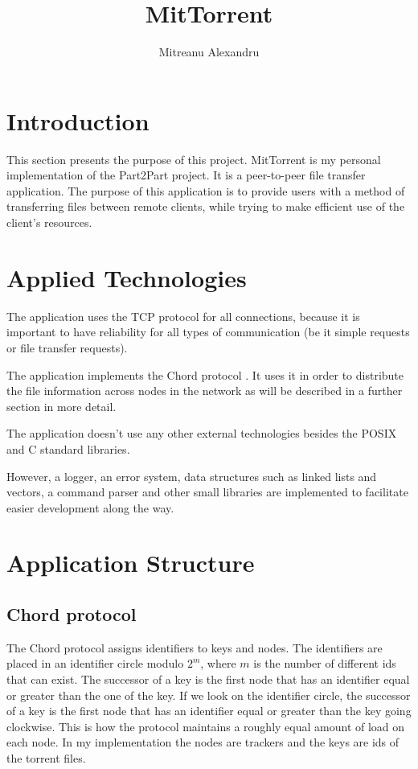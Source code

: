 \documentclass[runningheads]{llncs}
\begin{document}
%
\title{MitTorrent}
\author{Mitreanu Alexandru}

\maketitle

\section{Introduction} \label{intro}
This section presents the purpose of this project. MitTorrent is my personal implementation of the Part2Part project. It is a peer-to-peer file transfer application. The purpose of this application is to provide users with a method of transferring files between remote clients, while trying to make efficient use of the client's resources.

\section{Applied Technologies} \label{applied_technologies}
The application uses the TCP protocol for all connections, because it is important to have reliability for all types of communication (be it simple requests or file transfer requests).

The application implements the Chord protocol \cite{ref_url10}. It uses it in order to distribute the file information across nodes in the network as will be described in a further section in more detail.

The application doesn't use any other external technologies besides the POSIX and C standard libraries.

However, a logger, an error system, data structures such as linked lists and vectors, a command parser and other small libraries are implemented to facilitate easier development along the way.

\section{Application Structure} \label{app_structure}
\subsection{Chord protocol} \label{chord_protocol}
The Chord protocol assigns identifiers to keys and nodes. The identifiers are placed in an identifier circle modulo $2^m$, where $m$ is the number of different ids that can exist. The successor of a key is the first node that has an identifier equal or greater than the one of the key. If we look on the identifier circle, the successor of a key is the first node that has an identifier equal or greater than the key going clockwise. This is how the protocol maintains a roughly equal amount of load on each node. In my implementation the nodes are trackers and the keys are ids of the torrent files.
\end{document}
